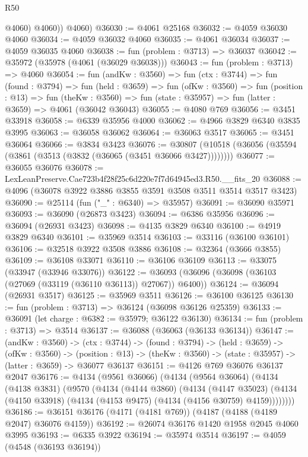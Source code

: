 \begin{lexlean}{R50}
\begin{coremodule}
            @4060)
          @4060))
      @4060)
@36030 := @4061 @25168
@36032 := @4059 @36030 @4060
@36034 := @4059 @36032 @4060
@36035 := @4061 @36034
@36037 := @4059 @36035 @4060
@36038 := fun (problem : @3713) => @36037
@36042 := @35972 (@35978 (@4061 (@36029 @36038)))
@36043 := fun (problem : @3713) => @4060
@36054 := fun (andKw : @3560) =>
  fun (ctx : @3744) =>
  fun (found : @3794) =>
  fun (held : @3659) =>
  fun (ofKw : @3560) =>
  fun (position : @13) =>
  fun (theKw : @3560) => fun (state : @35957) => fun (latter : @3659) => @4061 (@36042 @36043)
@36055 := @4080 @769
@36056 := @3451 @33918
@36058 := @6339 @35956 @4000
@36062 := @4966 @3829 @6340 @3835 @3995
@36063 := @36058 @36062
@36064 := @36063 @3517
@36065 := @3451 @36064
@36066 := @3834 @3423
@36076 := @30807 (@10518 (@36056 (@35594 (@3861 (@3513 (@3832 (@36065 (@3451 @36066 @3427))))))))
@36077 := @36055 @36076
@36078 := LexLeanPreserve.Cae723b4f28f25c6d220e7f7d64945ed3.R50.__fits_20
@36088 := @4096 (@36078 @3922 @3886 @3855 @3591 @3508 @3511 @3514 @3517 @3423)
@36090 := @25114 (fun ("_" : @6340) => @35957)
@36091 := @36090 @35971
@36093 := @36090 (@26873 @3423)
@36094 := @6386 @35956
@36096 := @36094 (@26931 @3423)
@36098 := @4135 @3829 @6340
@36100 := @4919 @3829 @6340
@36101 := @35969 @3514
@36103 := @33116 (@36100 @36101)
@36106 := @32518 @3922 @3508 @3886
@36108 := @32364 (@3666 @3855)
@36109 := @36108 @33071
@36110 := @36106 @36109
@36113 := @33075 (@33947 (@33946 @33076))
@36122 := @36093 (@36096 (@36098 (@36103 (@27069 (@33119 (@36110 @36113)) @27067)) @6400))
@36124 := @36094 (@26931 @3517)
@36125 := @35969 @3511
@36126 := @36100 @36125
@36130 := fun (problem : @3713) => @36124 (@36098 @36126 @25359)
@36133 := @36091 (let charge : @6382 := @35979; @36122 @36130)
@36134 := fun (problem : @3713) => @3514
@36137 := @36088 (@36063 (@36133 @36134))
@36147 := (andKw : @3560) ->
  (ctx : @3744) ->
  (found : @3794) ->
  (held : @3659) ->
  (ofKw : @3560) ->
  (position : @13) -> (theKw : @3560) -> (state : @35957) -> (latter : @3659) -> @36077 @36137
@36151 := @4126 @769 @36076 @36137 @2047
@36176 := @4134
    (@9561 @36066)
    (@4134
      (@9564 @36064)
      (@4134
        (@4138 @3831)
        (@9570
          (@4134
            (@4144 @3860)
            (@4134
              (@4147 @35023)
              (@4134 (@4150 @33918) (@4134 (@4153 @9475) (@4134 (@4156 @30759) @4159))))))))
@36186 := @36151 @36176 (@4171 (@4181 @769)) (@4187 (@4188 (@4189 @2047) @36076 @4159))
@36192 := @26074 @36176 @1420 @1958 @2045 @4060 @3995
@36193 := @6335 @3922
@36194 := @35974 @3514
@36197 := @4059 (@4548 (@36193 @36194))

\end{coremodule}
\end{lexlean}
